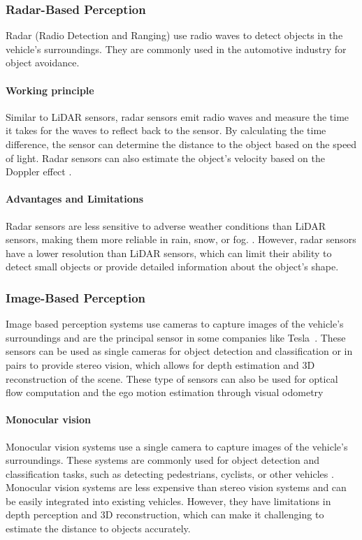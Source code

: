 \subsubsection{Radar-Based Perception}

Radar (Radio Detection and Ranging) use radio waves to detect objects in the vehicle's surroundings. They are commonly
used in the automotive industry for object avoidance. 

\paragraph{Working principle} Similar to LiDAR sensors, radar sensors emit radio waves and measure the time it takes for the waves to reflect back to the sensor. 
By calculating the time difference, the sensor can determine the distance to the object based on the speed of light. 
Radar sensors can also estimate the object's velocity based on the Doppler effect \cite{radarbased_velocity}.

\paragraph{Advantages and Limitations} Radar sensors are less sensitive to adverse weather conditions than LiDAR sensors, making them more reliable in rain, snow, or fog. \cite{autonomous_vehicles_perception_survey, radarbased_weather}. 
However, radar sensors have a lower resolution than LiDAR sensors, which can limit their ability to detect small objects or provide detailed information about the object's shape.

\subsubsection{Image-Based Perception}

Image based perception systems use cameras to capture images of the vehicle's surroundings and are the principal sensor
in some companies like Tesla~\cite{tesla_autopilot}. These sensors can be used as single cameras for object detection
and classification  or in pairs to provide stereo vision, which allows for depth estimation and 3D reconstruction of the scene.
These type of sensors can also be used for optical flow computation and the ego motion estimation through visual odometry

\paragraph{Monocular vision} Monocular vision systems use a single camera to capture images of the vehicle's surroundings. 
These systems are commonly used for object detection and classification tasks, such as detecting pedestrians, cyclists, or other vehicles \cite{autonomous_vehicles_perception_survey}. 
Monocular vision systems are less expensive than stereo vision systems and can be easily integrated into existing vehicles. 
However, they have limitations in depth perception and 3D reconstruction, which can make it 
challenging to estimate the distance to objects accurately. 

